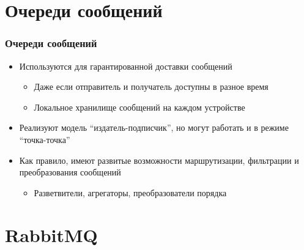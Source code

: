 \documentclass[xetex,mathserif,serif]{beamer}
\begin{document}
    \section{Очереди сообщений}

    \begin{frame}
        \frametitle{Очереди сообщений}
        \begin{itemize}
            \item Используются для гарантированной доставки сообщений
            \begin{itemize}
                \item Даже если отправитель и получатель доступны в разное время
                \item Локальное хранилище сообщений на каждом устройстве
            \end{itemize}
            \item Реализуют модель ``издатель-подписчик'', но могут работать и в режиме ``точка-точка''
            \item Как правило, имеют развитые возможности маршрутизации, фильтрации и преобразования сообщений
            \begin{itemize}
                \item Разветвители, агрегаторы, преобразователи порядка
            \end{itemize}
        \end{itemize}
    \end{frame}

    \section{RabbitMQ}
\end{document}
